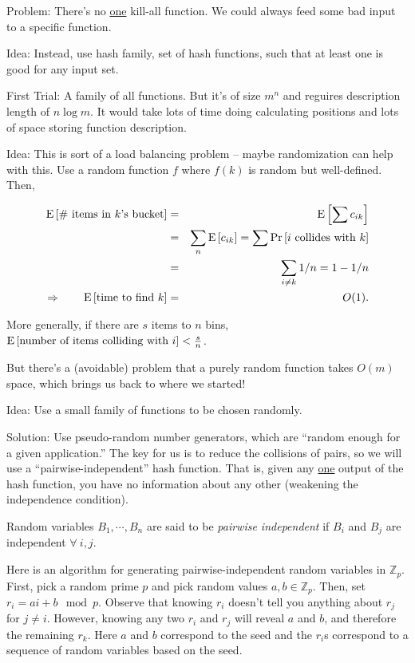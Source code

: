 \documentclass{article}
\renewcommand{\Pr}[1]{\textnormal{Pr}\left[ #1 \right]}
\newcommand{\E}[1]{\textnormal{E}\left[ #1 \right]}
\begin{document}
Problem: There's no \underline{one} kill-all function. We could always feed some bad input to a specific function.

Idea: Instead, use hash family, set of hash functions, such that at least one is good for any input set.

First Trial: A family of all functions. But it's of size $m^n$ and reguires description length of $n \log m$.
It would take lots of time doing calculating positions and lots of space storing function description.

Idea: This is sort of a load balancing problem -- maybe randomization can help with this.
Use a random function $f$ where $f(k)$ is random but well-defined.  Then,

\begin{eqnarray*}
  \E{\hbox{\# items in $k$'s bucket}} & = & \E{\sum c_{ik}}
  \\
  & = & \sum_n \E{ c_{ik} } = \sum \Pr{i\hbox{ collides with } k} \\
  & = & \sum_{i \not= k} 1/n = 1 - 1/n \\
  \Rightarrow \qquad \E{\hbox{time to find } k}  & = & O(1).
\end{eqnarray*}

More generally, if there are $s$ items to $n$ bins, $\E{\hbox{number of items colliding with }i} < \frac{s}{n}$.

But there's a (avoidable) problem that a purely random function takes $O(m)$ space, which brings us back to where we started!

Idea: Use a small family of functions to be chosen randomly.

Solution: Use pseudo-random number generators, which are ``random enough for a given application.''  The key for us is to reduce the collisions of pairs, so we will use a ``pairwise-independent'' hash function.  That is, given any \underline{one} output of the hash function, you have no information about any other (weakening the independence condition).

\begin{definition}

Random variables $B_1, \cdots, B_n$ are said to be \emph{pairwise independent} if $B_i$ and $B_j$ are independent $\forall\ i, j$.
\end{definition}

Here is an algorithm for generating pairwise-independent random variables in
${\mathbb Z}_p$.  First, pick a random prime $p$ and pick random values $a, b
\in {\mathbb Z}_p$.  Then, set $r_i = ai + b \mod p$.  Observe that
knowing $r_i$ doesn't tell you anything about $r_j$ for $j \not= i$.  However,
knowing any two $r_i$ and $r_j$ will reveal $a$ and $b$, and therefore the
remaining $r_k$.  Here $a$ and $b$ correspond to the seed and the $r_i$s
correspond to a sequence of random variables based on the seed.
\end{document}
